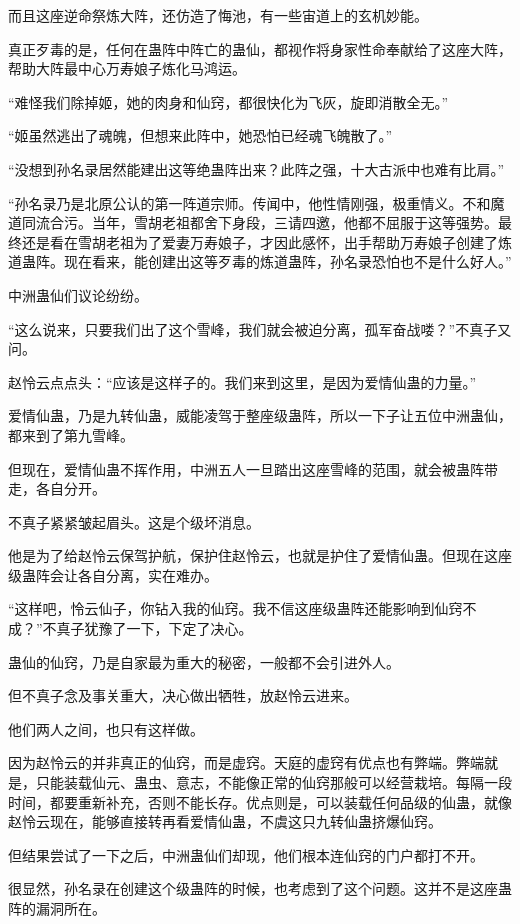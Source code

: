 \begin{this_body}
而且这座逆命祭炼大阵，还仿造了悔池，有一些宙道上的玄机妙能。

真正歹毒的是，任何在蛊阵中阵亡的蛊仙，都视作将身家性命奉献给了这座大阵，帮助大阵最中心万寿娘子炼化马鸿运。

“难怪我们除掉姬，她的肉身和仙窍，都很快化为飞灰，旋即消散全无。”

“姬虽然逃出了魂魄，但想来此阵中，她恐怕已经魂飞魄散了。”

“没想到孙名录居然能建出这等绝蛊阵出来？此阵之强，十大古派中也难有比肩。”

“孙名录乃是北原公认的第一阵道宗师。传闻中，他性情刚强，极重情义。不和魔道同流合污。当年，雪胡老祖都舍下身段，三请四邀，他都不屈服于这等强势。最终还是看在雪胡老祖为了爱妻万寿娘子，才因此感怀，出手帮助万寿娘子创建了炼道蛊阵。现在看来，能创建出这等歹毒的炼道蛊阵，孙名录恐怕也不是什么好人。”

中洲蛊仙们议论纷纷。

“这么说来，只要我们出了这个雪峰，我们就会被迫分离，孤军奋战喽？”不真子又问。

赵怜云点点头：“应该是这样子的。我们来到这里，是因为爱情仙蛊的力量。”

爱情仙蛊，乃是九转仙蛊，威能凌驾于整座级蛊阵，所以一下子让五位中洲蛊仙，都来到了第九雪峰。

但现在，爱情仙蛊不挥作用，中洲五人一旦踏出这座雪峰的范围，就会被蛊阵带走，各自分开。

不真子紧紧皱起眉头。这是个级坏消息。

他是为了给赵怜云保驾护航，保护住赵怜云，也就是护住了爱情仙蛊。但现在这座级蛊阵会让各自分离，实在难办。

“这样吧，怜云仙子，你钻入我的仙窍。我不信这座级蛊阵还能影响到仙窍不成？”不真子犹豫了一下，下定了决心。

蛊仙的仙窍，乃是自家最为重大的秘密，一般都不会引进外人。

但不真子念及事关重大，决心做出牺牲，放赵怜云进来。

他们两人之间，也只有这样做。

因为赵怜云的并非真正的仙窍，而是虚窍。天庭的虚窍有优点也有弊端。弊端就是，只能装载仙元、蛊虫、意志，不能像正常的仙窍那般可以经营栽培。每隔一段时间，都要重新补充，否则不能长存。优点则是，可以装载任何品级的仙蛊，就像赵怜云现在，能够直接转再看爱情仙蛊，不虞这只九转仙蛊挤爆仙窍。

但结果尝试了一下之后，中洲蛊仙们却现，他们根本连仙窍的门户都打不开。

很显然，孙名录在创建这个级蛊阵的时候，也考虑到了这个问题。这并不是这座蛊阵的漏洞所在。


\end{this_body}
